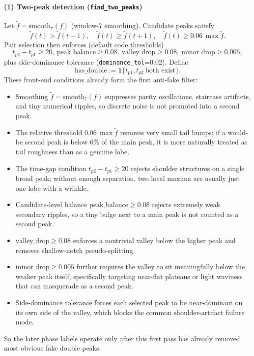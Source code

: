 \documentclass[11pt]{article}
\begin{document}
\paragraph{(1) Two-peak detection (\texttt{find\_two\_peaks})}
Let $\tilde f=\mathrm{smooth}_7(f)$ (window-7 smoothing). Candidate peaks satisfy
\[
\tilde f(t)>\tilde f(t-1),\quad \tilde f(t)\ge \tilde f(t+1),\quad \tilde f(t)\ge 0.06\,\max \tilde f.
\]
Pair selection then enforces (default code thresholds)
\[
t_{p2}-t_{p1}\ge 20,\ \mathrm{peak\_balance}\ge 0.08,\ \mathrm{valley\_drop}\ge 0.08,\ \mathrm{minor\_drop}\ge 0.005,
\]
plus side-dominance tolerance (\texttt{dominance\_tol}=0.02). Define
\[
\mathrm{has\_double}:=\mathbf 1\{t_{p1},t_{p2}\ \text{both exist}\}.
\]
These front-end conditions already form the first anti-fake filter:
\begin{itemize}
  \item Smoothing $\tilde f=\mathrm{smooth}_7(f)$ suppresses parity oscillations, staircase artifacts, and tiny numerical ripples, so discrete noise is not promoted into a second peak.
  \item The relative threshold $0.06\,\max\tilde f$ removes very small tail bumps; if a would-be second peak is below $6\%$ of the main peak, it is more naturally treated as tail roughness than as a genuine lobe.
  \item The time-gap condition $t_{p2}-t_{p1}\ge 20$ rejects shoulder structures on a single broad peak; without enough separation, two local maxima are usually just one lobe with a wrinkle.
  \item Candidate-level balance $\mathrm{peak\_balance}\ge 0.08$ rejects extremely weak secondary ripples, so a tiny bulge next to a main peak is not counted as a second peak.
  \item $\mathrm{valley\_drop}\ge 0.08$ enforces a nontrivial valley below the higher peak and removes shallow-notch pseudo-splitting.
  \item $\mathrm{minor\_drop}\ge 0.005$ further requires the valley to sit meaningfully below the weaker peak itself, specifically targeting near-flat plateaus or light waviness that can masquerade as a second peak.
  \item Side-dominance tolerance forces each selected peak to be near-dominant on its own side of the valley, which blocks the common shoulder-artifact failure mode.
\end{itemize}
So the later phase labels operate only after this first pass has already removed most obvious fake double peaks.
\end{document}
